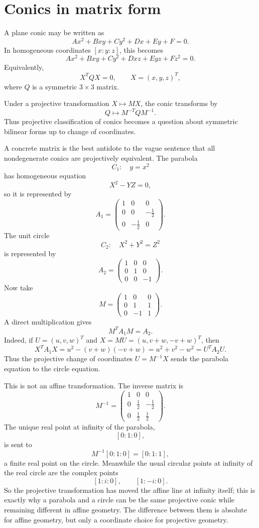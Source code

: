\section{Conics in matrix form}

A plane conic may be written as
\[
  Ax^2+Bxy+Cy^2+Dx+Ey+F=0.
\]
In homogeneous coordinates \([x:y:z]\), this becomes
\[
  Ax^2+Bxy+Cy^2+Dxz+Eyz+Fz^2=0.
\]
Equivalently,
\[
  X^TQX=0,\qquad X=(x,y,z)^T,
\]
where \(Q\) is a symmetric \(3\times3\) matrix.

Under a projective transformation \(X\mapsto MX\), the conic transforms by
\[
  Q\mapsto M^{-T}QM^{-1}.
\]
Thus projective classification of conics becomes a question about symmetric bilinear forms up to change of coordinates.

A concrete matrix is the best antidote to the vague sentence that all nondegenerate conics are projectively equivalent.  The parabola
\[
  C_1:\quad y=x^2
\]
has homogeneous equation
\[
  X^2-YZ=0,
\]
so it is represented by
\[
  A_1=
  \begin{pmatrix}
  1&0&0\\
  0&0&-\frac12\\
  0&-\frac12&0
  \end{pmatrix}.
\]
The unit circle
\[
  C_2:\quad X^2+Y^2=Z^2
\]
is represented by
\[
  A_2=
  \begin{pmatrix}
  1&0&0\\
  0&1&0\\
  0&0&-1
  \end{pmatrix}.
\]
Now take
\[
  M=
  \begin{pmatrix}
  1&0&0\\
  0&1&1\\
  0&-1&1
  \end{pmatrix}.
\]
A direct multiplication gives
\[
  M^TA_1M=A_2.
\]
Indeed, if \(U=(u,v,w)^T\) and \(X=MU=(u,v+w,-v+w)^T\), then
\[
  X^TA_1X
  =
  u^2-(v+w)(-v+w)
  =
  u^2+v^2-w^2
  =
  U^TA_2U.
\]
Thus the projective change of coordinates \(U=M^{-1}X\) sends the parabola equation to the circle equation.

This is not an affine transformation.  The inverse matrix is
\[
  M^{-1}=
  \begin{pmatrix}
  1&0&0\\
  0&\frac12&-\frac12\\
  0&\frac12&\frac12
  \end{pmatrix}.
\]
The unique real point at infinity of the parabola,
\[
  [0:1:0],
\]
is sent to
\[
  M^{-1}[0:1:0]=[0:1:1],
\]
a finite real point on the circle.  Meanwhile the usual circular points at infinity of the real circle are the complex points
\[
  [1:i:0],\qquad [1:-i:0].
\]
So the projective transformation has moved the affine line at infinity itself; this is exactly why a parabola and a circle can be the same projective conic while remaining different in affine geometry.  The difference between them is absolute for affine geometry, but only a coordinate choice for projective geometry.

